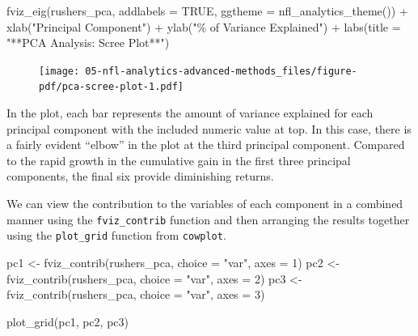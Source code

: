 \documentclass[
  letterpaper,
]{krantz}
\newenvironment{Shaded}{\begin{snugshade}}{\end{snugshade}}
\newcommand{\AttributeTok}[1]{\textcolor[rgb]{0.40,0.45,0.13}{#1}}
\newcommand{\ConstantTok}[1]{\textcolor[rgb]{0.56,0.35,0.01}{#1}}
\newcommand{\DecValTok}[1]{\textcolor[rgb]{0.68,0.00,0.00}{#1}}
\newcommand{\FunctionTok}[1]{\textcolor[rgb]{0.28,0.35,0.67}{#1}}
\newcommand{\NormalTok}[1]{\textcolor[rgb]{0.00,0.23,0.31}{#1}}
\newcommand{\OtherTok}[1]{\textcolor[rgb]{0.00,0.23,0.31}{#1}}
\newcommand{\SpecialCharTok}[1]{\textcolor[rgb]{0.37,0.37,0.37}{#1}}
\newcommand{\StringTok}[1]{\textcolor[rgb]{0.13,0.47,0.30}{#1}}
\begin{document}
\begin{Shaded}
\begin{Highlighting}[]
\FunctionTok{fviz\_eig}\NormalTok{(rushers\_pca, }\AttributeTok{addlabels =} \ConstantTok{TRUE}\NormalTok{,}
         \AttributeTok{ggtheme =} \FunctionTok{nfl\_analytics\_theme}\NormalTok{()) }\SpecialCharTok{+}
  \FunctionTok{xlab}\NormalTok{(}\StringTok{"Principal Component"}\NormalTok{) }\SpecialCharTok{+}
  \FunctionTok{ylab}\NormalTok{(}\StringTok{"\% of Variance Explained"}\NormalTok{) }\SpecialCharTok{+}
  \FunctionTok{labs}\NormalTok{(}\AttributeTok{title =} \StringTok{"**PCA Analysis: Scree Plot**"}\NormalTok{)}
\end{Highlighting}
\end{Shaded}

\begin{figure}[H]

{\centering \texttt{[image: 05-nfl-analytics-advanced-methods\_files/figure-pdf/pca-scree-plot-1.pdf]}

}

\end{figure}

In the plot, each bar represents the amount of variance explained for
each principal component with the included numeric value at top. In this
case, there is a fairly evident ``elbow'' in the plot at the third
principal component. Compared to the rapid growth in the cumulative gain
in the first three principal components, the final six provide
diminishing returns.

We can view the contribution to the variables of each component in a
combined manner using the \texttt{fviz\_contrib} function and then
arranging the results together using the \texttt{plot\_grid} function
from \texttt{cowplot}.

\begin{Shaded}
\begin{Highlighting}[]
\NormalTok{pc1 }\OtherTok{\textless{}{-}} \FunctionTok{fviz\_contrib}\NormalTok{(rushers\_pca, }\AttributeTok{choice =} \StringTok{"var"}\NormalTok{, }\AttributeTok{axes =} \DecValTok{1}\NormalTok{)}
\NormalTok{pc2 }\OtherTok{\textless{}{-}} \FunctionTok{fviz\_contrib}\NormalTok{(rushers\_pca, }\AttributeTok{choice =} \StringTok{"var"}\NormalTok{, }\AttributeTok{axes =} \DecValTok{2}\NormalTok{)}
\NormalTok{pc3 }\OtherTok{\textless{}{-}} \FunctionTok{fviz\_contrib}\NormalTok{(rushers\_pca, }\AttributeTok{choice =} \StringTok{"var"}\NormalTok{, }\AttributeTok{axes =} \DecValTok{3}\NormalTok{)}

\FunctionTok{plot\_grid}\NormalTok{(pc1, pc2, pc3)}
\end{Highlighting}
\end{Shaded}
\end{document}
